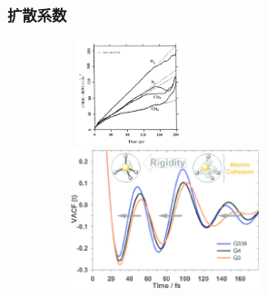 \frame
{
	\frametitle{扩散系数}
\begin{figure}[h!]
\centering
\vspace*{-0.2in}
\includegraphics[height=1.2in,width=2.0in,viewport=0 0 350 300,clip]{Figures/MSD_O2-N2-CO2-CH4.png}\\
\includegraphics[height=1.6in,width=2.8in,viewport=0 0 230 160,clip]{Figures/The-velocity-autocorrelation-function-VACF-of-the-Al-atoms-showing-the-increase-of-rigidity of the local Al-coordination-for-G3-G4-and-G338-glasses.png}
\label{MSD-VACF}
\end{figure}
}

